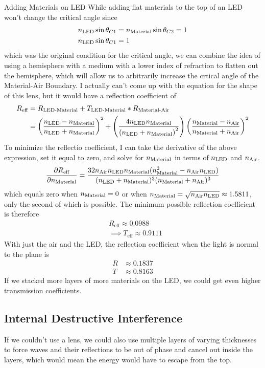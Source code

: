 \documentclass[12pt]{article}
\newcommand{\enterProblemHeader}[1]{
	\rhead{#1}
}
\newenvironment{main_section}[1]{
	\section{#1}
	\enterProblemHeader{#1}
}{
	\pagebreak
}
\newcommand{\pderiv}[2]{\frac{\partial #1}{\partial #2}}
\begin{document}
\begin{main_section}{Adding Materials on LED}
	While adding flat materials to the top of an LED won't change the critical
	angle since
	\begin{align*}
		&n_\text{LED} \sin \theta_{C1} = n_\text{Material} \sin \theta_{C2} = 1\\
		&n_\text{LED} \sin \theta_{C1} = 1
	\end{align*}
	which was the original condition for the critical angle, we can combine the
	idea of using a hemisphere with a medium with a lower index of refraction to
	flatten out the hemisphere, which will allow us to arbitrarily increase the
	crtical angle of the Material-Air Boundary. I actually can't come up with
	the equation for the shape of this lens, but it would have a reflection
	coefficient of
	\begin{align*}
		R_\text{eff} &= R_\text{LED-Material} + T_\text{LED-Material} * R_\text{Material-Air}\\
		&= \left( \frac {n_\text{LED} - n_\text{Material}} {n_\text{LED} + n_\text{Material}} \right)^2 + \left( \frac
		{4 n_\text{LED} n_\text{Material}} {\left( n_\text{LED} + n_\text{Material} \right)^2} \right) \left( \frac
		{n_\text{Material} - n_\text{Air}} {n_\text{Material} + n_\text{Air}} \right)^2
	\end{align*}
	To minimize the reflectio coefficient, I can take the derivative of the
	above expression, set it equal to zero, and solve for $n_\text{Material}$ in terms of
	$n_\text{LED}$ and $n_\text{Air}$.
	\[
		\pderiv { R_\text{eff} } { \nmat } = \frac {32 \nair \nled \nmat
		(\nmat^2 - \nair \nled)} { (\nled + \nmat)^3 (\nmat + \nair)^3 }
	\]
	which equals zero when $n_\text{Material} = 0$ or when $n_\text{Material} = \sqrt{ n_\text{Air} n_\text{LED} }
	\approx 1.5811$, only the second of which is possible. The minimum possible
	reflection coefficient is therefore
	\begin{align*}
		&R_\text{eff} \approx 0.0988\\
		&\implies T_\text{eff} \approx 0.9111
	\end{align*}
	With just the air and the LED, the reflection coefficient when the light is
	normal to the plane is
	\begin{align*}
		R &\approx 0.1837\\
		T &\approx 0.8163
	\end{align*}
	If we stacked more layers of more materials on the LED, we could get even
	higher transmission coefficients.

	\subsection{Internal Destructive Interference}
	If we couldn't use a lens, we could also use multiple layers of varying
	thicknesses to force waves and their reflections to be out of phase and
	cancel out inside the layers, which would mean the energy would have to
	escape from the top.
\end{main_section}
\end{document}
